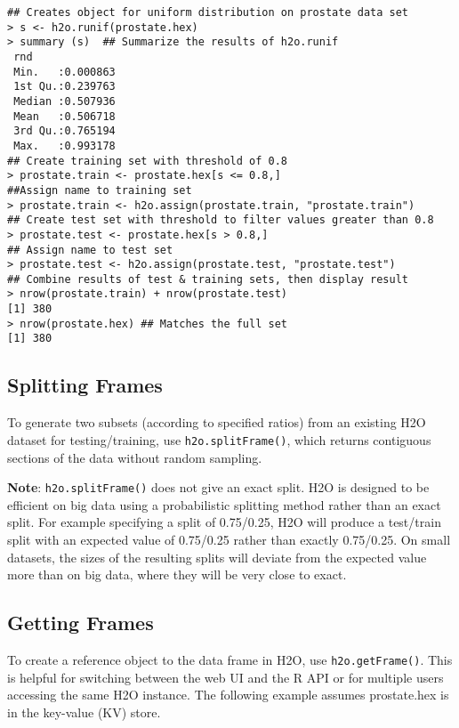 {{\begin{lstlisting}[style=R]
## Creates object for uniform distribution on prostate data set
> s <- h2o.runif(prostate.hex)
> summary (s)  ## Summarize the results of h2o.runif
 rnd
 Min.   :0.000863
 1st Qu.:0.239763
 Median :0.507936
 Mean   :0.506718
 3rd Qu.:0.765194
 Max.   :0.993178
## Create training set with threshold of 0.8
> prostate.train <- prostate.hex[s <= 0.8,]
##Assign name to training set
> prostate.train <- h2o.assign(prostate.train, "prostate.train")
## Create test set with threshold to filter values greater than 0.8
> prostate.test <- prostate.hex[s > 0.8,]
## Assign name to test set
> prostate.test <- h2o.assign(prostate.test, "prostate.test")
## Combine results of test & training sets, then display result
> nrow(prostate.train) + nrow(prostate.test)
[1] 380
> nrow(prostate.hex) ## Matches the full set
[1] 380
\end{lstlisting}


\subsection{Splitting Frames}


To generate two subsets (according to specified ratios) from an existing H2O dataset for testing/training, use {\texttt{h2o.splitFrame()}}, which returns contiguous sections of the data without random sampling.

{\bf{Note}}: {\texttt{h2o.splitFrame()}} does not give an exact split. H2O is designed to be efficient on big data using a probabilistic splitting method rather than an exact split. For example specifying a split of 0.75/0.25, H2O will produce a test/train split with an expected value of 0.75/0.25 rather than exactly 0.75/0.25. On small datasets, the sizes of the resulting splits will deviate from the expected value more than on big data, where they will be very close to exact.

\newpage
\waterExampleInR
\medskip



\subsection{Getting Frames}


To create a reference object to the data frame in H2O, use {\texttt{h2o.getFrame()}}. This is helpful for  switching between the web UI and the R API or for multiple users accessing the same H2O instance. The following example assumes prostate.hex is in the key-value (KV) store.

}}

